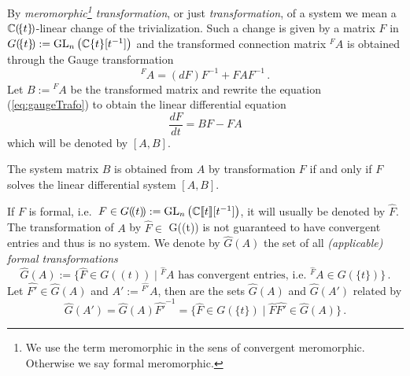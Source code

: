 By \emph{meromorphic\footnote{We use the term meromorphic in the sens of
convergent meromorphic. Otherwise we say formal meromorphic.} transformation},
or just \emph{transformation}, of a system we mean a $\mathbb{C}(\!\{t\}\!)$-linear
change of the trivialization.
Such a change is given by a matrix $F$ in
$G(\!\{t\}\!):=\operatorname{GL}_n\left(\mathbb{C}\{t\}[t^{-1}]\right)$ and the transformed connection
matrix ${}^F\!A$ is obtained through the Gauge transformation
\begin{equation}\label{eq:gaugeTrafo}
  {}^F\!A=(dF)F^{-1} + FAF^{-1} \,.
\end{equation}
Let $B:={}^F\!A$ be the transformed matrix and rewrite the equation
(\ref{eq:gaugeTrafo}) to obtain the linear differential equation
\[
    \frac{dF}{dt}=BF-FA
\]
which will be denoted by $[A,B]$.
\begin{rem}
  The system matrix $B$ is obtained from $A$ by transformation $F$ if and only
  if $F$ solves the linear differential system $[A,B]$.
\end{rem}

If $F$ is formal, i.e.\
$F\in G(\!(t)\!):=\operatorname{GL}_n\left(\mathbb{C}\llbracket t\rrbracket[t^{-1}]\right)$, it will
usually be denoted by $\hat F$.
The transformation of $A$ by $\hat F\in$ G(\!(t)\!) is not guaranteed to have
convergent entries and thus is no system.
We denote by $\hat G(A)$ the set of all \emph{(applicable) formal
transformations}
\[
  \hat G(A):=\bigl\{\hat F\in G(\!(t)\!)
    \mid {}^{\hat F}\!A
    \text{ has convergent entries, i.e.\ ${}^{\hat F}\!A\in G(\!\{t\}\!)$}
  \bigr\}\,.
\]
Let $\hat{F'}\in\hat G(A)$ and $A':={}^{\hat{F'}}\!A$, then are the sets
$\hat G(A)$ and $\hat G(A')$ related by
\[
  \hat G(A')=\hat G(A)\hat{F'}^{-1}=\bigl\{
    \hat F\in G(\!\{t\}\!) \mid \hat F\hat{F'}\in\hat G(A)
  \bigr\} \,.
\]

